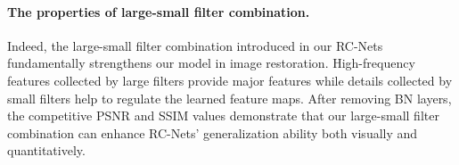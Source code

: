 \documentclass[10pt,twocolumn,letterpaper]{article}
\begin{document}
\paragraph{The properties of large-small filter combination.} Indeed, the large-small filter combination introduced in our RC-Nets fundamentally strengthens our model in image restoration. High-frequency features collected by large filters provide major features while details collected by small filters help to regulate the learned feature maps. After removing BN layers, the competitive PSNR and SSIM values demonstrate that our large-small filter combination can enhance RC-Nets' generalization ability both visually and quantitatively.  

 
\end{document}
